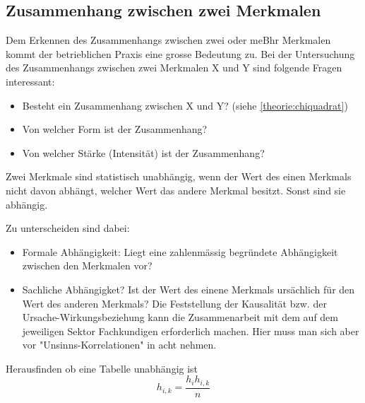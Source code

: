 \subsection{Zusammenhang zwischen zwei Merkmalen}
Dem Erkennen des Zusammenhangs zwischen zwei oder meBhr Merkmalen kommt der betrieblichen Praxis eine grosse Bedeutung zu. Bei der Untersuchung des Zusammenhangs zwischen zwei Merkmalen X und Y sind folgende Fragen interessant:
\begin{itemize}
\item Besteht ein Zusammenhang zwischen X und Y? (siehe \autoref{theorie:chiquadrat})
\item Von welcher Form ist der Zusammenhang?
\item Von welcher Stärke (Intensität) ist der Zusammenhang?
\end{itemize}
\begin{tcolorbox}[colback=green!5,colframe=green!40!black, title=Abhängigkeit]
Zwei Merkmale sind statistisch unabhängig, wenn der Wert des einen Merkmals nicht davon abhängt, welcher Wert das andere Merkmal besitzt. Sonst sind sie abhängig.
\end{tcolorbox}
Zu unterscheiden sind dabei:
\begin{itemize}
\item Formale Abhängigkeit: 
\subitem Liegt eine zahlenmässig begründete Abhängigkeit zwischen den Merkmalen vor?
\item Sachliche Abhängigket?
\subitem Ist der Wert des einene Merkmals ursächlich für den Wert des anderen Merkmals? Die Feststellung der Kausalität bzw. der Ursache-Wirkungsbeziehung kann die Zusammenarbeit mit dem auf dem jeweiligen Sektor Fachkundigen erforderlich machen. Hier muss man sich aber vor "Unsinns-Korrelationen" in acht nehmen.
\end{itemize}
Herausfinden ob eine Tabelle unabhängig ist
\begin{equation}\label{eq:zusammenhang:1}
h_{i,k}=\frac{h_i h_{i,k}}{n}
\end{equation}
